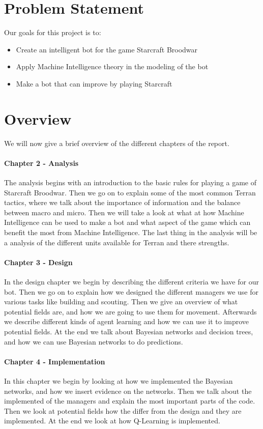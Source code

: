 \section{Problem Statement}
	Our goals for this project is to:
	\begin{itemize}
		\item Create an intelligent bot for the game Starcraft Broodwar
		\item Apply Machine Intelligence theory in the modeling of the bot
		\item Make a bot that can improve by playing Starcraft
	\end{itemize}

\section{Overview}
	We will now give a brief overview of the different chapters of the report.

\paragraph*{Chapter 2 - Analysis}
The analysis begins with an introduction to the basic rules for playing a game of Starcraft Broodwar. Then we go on to explain some of the most common Terran tactics, where we talk about the importance of information and the balance between macro and micro. Then we will take a look at what at how Machine Intelligence can be used to make a bot and what aspect of the game which can benefit the most from Machine Intelligence. The last thing in the analysis will be a analysis of the different units available for Terran and there strengths.

\paragraph*{Chapter 3 - Design}
In the design chapter we begin by describing the different criteria we have for our bot. Then we go on to explain how we designed the different managers we use for various tasks like building and scouting. Then we give an overview of what potential fields are, and how we are going to use them for movement. Afterwards we describe different kinds of agent learning and how we can use it to improve potential fields. At the end we talk about Bayesian networks and decision trees, and how we can use Bayesian networks to do predictions.

\paragraph*{Chapter 4 - Implementation}
In this chapter we begin by looking at how we implemented the Bayesian networks, and how we insert evidence on the networks. Then we talk about the implemented of the managers and explain the most important parts of the code. Then we look at potential fields how the differ from the design and they are implemented. At the end we look at how Q-Learning is implemented.

